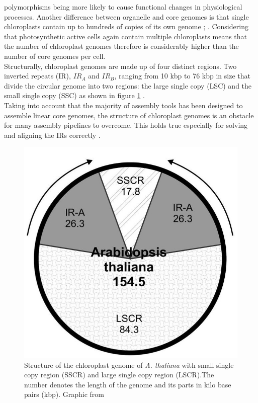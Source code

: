polymorphisms being more likely to cause functional changes in physiological
processes. Another difference between organelle and core genomes is that single
chloroplasts contain up to hundreds of copies of its own genome \cite{kumar_2014};
\cite{bendich_1987}. Considering that photosynthetic active cells again contain multiple
chloroplasts means that the number of chloroplast genomes therefore is considerably higher than the number of core genomes per cell. \\
Structurally, chloroplast genomes are made up of four distinct regions. Two inverted
repeats (IR), $IR_A$ and $IR_B$, ranging from 10 kbp to 76 kbp in size that divide the
circular genome into two regions: the large
single copy (LSC) and the small single copy (SSC) as shown in figure \ref{fig:cpast_genome} \cite{palmer_1985}.\\
Taking into account that the majority of assembly tools has been designed to assemble
linear core genomes, the structure of chloroplast genomes is an obstacle for many assembly
pipelines to overcome. This holds true especially for solving and aligning the IRs
correctly \cite{Wang2018}.

\begin{figure}[H]
\centering
\includegraphics[height=.55\textheight, width=.95\textwidth]{Figures/cpast}
\decoRule
\caption[Structure of a chloroplast genome]{Structure of the chloroplast genome of
  \textit{A. thaliana} with small single copy region (SSCR) and large single copy region
  (LSCR).The number denotes the length of the genome and its parts in kilo base pairs
  (kbp). Graphic from \cite{olejniczak2016chloroplasts}}
\label{fig:cpast_genome}
\end{figure}

